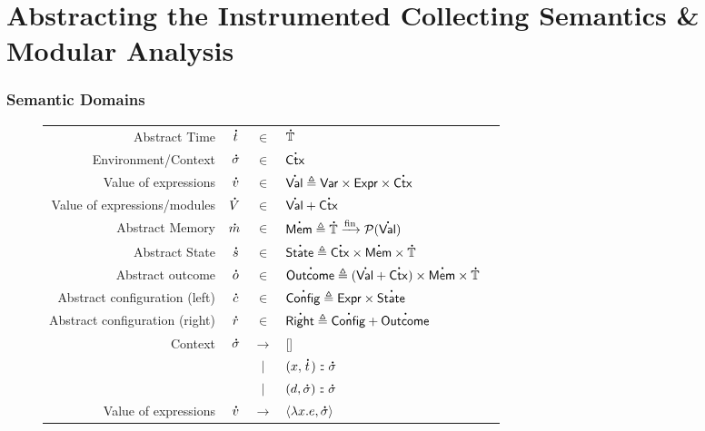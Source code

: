 \documentclass{beamer}
\theoremstyle{definition}
\newcommand*{\vbar}{|}
\newcommand*{\cons}{:{\hspace{-0.7em}}:}
\newcommand*{\pset}{\mathcal{P}}
\newcommand*{\A}[1]{\overset{\,_{\mbox{\Large .}}}{#1}}
\newcommand*{\Expr}{\mathsf{Expr}}
\newcommand*{\ExprVar}{\mathsf{Var}}
\newcommand*{\modid}{d}
\newcommand*{\Time}{\mathbb{T}}
\newcommand*{\ctx}{\sigma}
\newcommand*{\Ctx}{\mathsf{Ctx}}
\newcommand*{\Value}{\mathsf{Val}}
\newcommand*{\Mem}{\mathsf{Mem}}
\newcommand*{\mem}{m}
\newcommand*{\Config}{\mathsf{Config}}
\newcommand*{\config}{c}
\newcommand*{\Right}{\mathsf{Right}}
\newcommand*{\rightst}{r}
\newcommand*{\State}{\mathsf{State}}
\newcommand*{\Outcome}{\mathsf{Outcome}}
\newcommand*{\fin}[2]{{#1}\xrightarrow{\text{fin}}{#2}}
\begin{document}
\section{Abstracting the Instrumented Collecting Semantics \& Modular Analysis}
\begin{frame}[c]
  \frametitle{Semantic Domains}
  \begin{figure}[h!]
    \footnotesize
    \centering
    \begin{tabular}{rrcll}
      Abstract Time                  & $\A{t}$        & $\in$         & $\A{\Time}$                                                                 \\
      Environment/Context            & $\A{\ctx}$     & $\in$         & $\A{\Ctx}$                                                                  \\
      Value of expressions           & $\A{v}$        & $\in$         & $\A{\Value} \triangleq \ExprVar\times\Expr\times\A{\Ctx}$                   \\
      Value of expressions/modules   & $\A{V}$        & $\in$         & $\A{\Value}+\A{\Ctx}$                                                       \\
      Abstract Memory                & $\A{\mem}$     & $\in$         & $\A{\Mem} \triangleq \fin{\A{\Time}}{\pset(\A{\Value})}$                    \\
      Abstract State                 & $\A{s}$        & $\in$         & $\A{\State} \triangleq \A{\Ctx}\times\A{\Mem}\times\A{\Time}$               \\
      Abstract outcome               & $\A{o}$        & $\in$         & $\A{\Outcome} \triangleq(\A{\Value}+\A{\Ctx})\times\A{\Mem}\times\A{\Time}$ \\
      Abstract configuration (left)  & $\A{\config}$  & $\in$         & $\A{\Config}\triangleq\Expr\times\A{\State}$                                \\
      Abstract configuration (right) & $\A{\rightst}$ & $\in$         & $\A{\Right}\triangleq\A{\Config}+\A{\Outcome}$                              \\
      Context                        & $\A{\ctx}$     & $\rightarrow$ & []                                                                          \\
                                     &                & $\vbar$       & $(x,\A{t})\cons \A{\ctx}$                                                   \\
                                     &                & $\vbar$       & $(\modid,\A{\ctx})\cons \A{\ctx}$                                           \\
      Value of expressions           & $\A{v}$        & $\rightarrow$ & $\langle \lambda x.e, \A{\ctx} \rangle$
    \end{tabular}
  \end{figure}
\end{frame}
\end{document}
